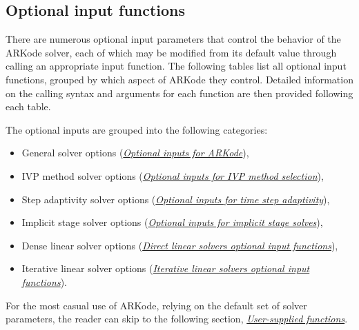 \documentclass[letterpaper,10pt,english]{sphinxmanual}
\begin{document}
\subsection{Optional input functions}
\label{c_interface/User_callable:cinterface-optionalinputs}\label{c_interface/User_callable:optional-input-functions}
There are numerous optional input parameters that control the behavior
of the ARKode solver, each of which may be modified from its default
value through calling an appropriate input function.  The following
tables list all optional input functions, grouped by which aspect of
ARKode they control.  Detailed information on the calling syntax and
arguments for each function are then provided following each table.

The optional inputs are grouped into the following categories:
\begin{itemize}
\item {} 
General solver options ({\hyperref[c_interface/User_callable:cinterface-arkodeinputtable]{\emph{Optional inputs for ARKode}}}),

\item {} 
IVP method solver options ({\hyperref[c_interface/User_callable:cinterface-arkodemethodinputtable]{\emph{Optional inputs for IVP method selection}}}),

\item {} 
Step adaptivity solver options ({\hyperref[c_interface/User_callable:cinterface-arkodeadaptivityinputtable]{\emph{Optional inputs for time step adaptivity}}}),

\item {} 
Implicit stage solver options ({\hyperref[c_interface/User_callable:cinterface-cinterface-arkodesolverinputtable]{\emph{Optional inputs for implicit stage solves}}}),

\item {} 
Dense linear solver options ({\hyperref[c_interface/User_callable:cinterface-arkdlsinputs]{\emph{Direct linear solvers optional input functions}}}),

\item {} 
Iterative linear solver options ({\hyperref[c_interface/User_callable:cinterface-arkspilsinputs]{\emph{Iterative linear solvers optional input functions}}}).

\end{itemize}

For the most casual use of ARKode, relying on the default set of
solver parameters, the reader can skip to the following section,
{\hyperref[c_interface/User_supplied:cinterface-usersupplied]{\emph{User-supplied functions}}}.
\end{document}
